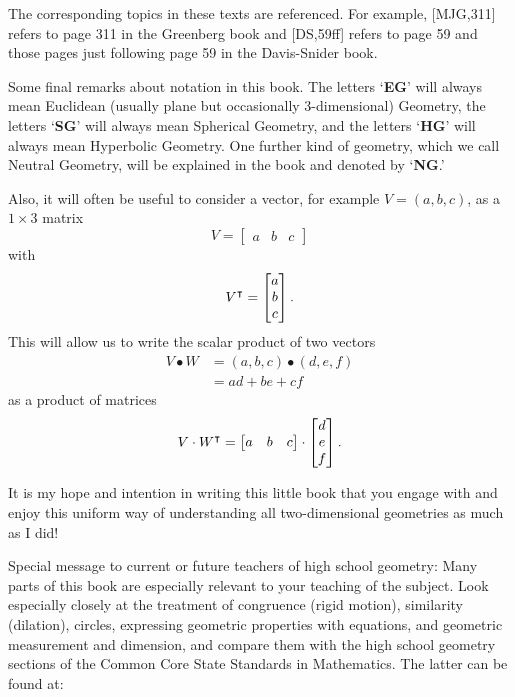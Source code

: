 \documentclass{ximera}
\begin{document}
The corresponding topics in these texts are referenced. For example, [MJG,311]
refers to page 311 in the Greenberg book and [DS,59ff] refers to page 59 and
those pages just following page 59 in the Davis-Snider book.

Some final remarks about notation in this book. The letters `\textbf{EG}' will
always mean Euclidean (usually plane but occasionally $3$-dimensional)
Geometry, the letters `\textbf{SG}' will always mean Spherical Geometry, and
the letters `\textbf{HG}' will always mean Hyperbolic Geometry. One further
kind of geometry, which we call Neutral Geometry, will be explained in the
book and denoted by `\textbf{NG}.'

Also, it will often be useful to consider a vector, for example
$V=\left(a,b,c\right)$, as a $1\times3$ matrix
\[
V=
\begin{bmatrix}
a & b & c
\end{bmatrix}
\]
with
\[
V^\intercal  =
\begin{bmatrix}
a\\
b\\
c
\end{bmatrix}.
\]
This will allow us to write the scalar product of two vectors%
\begin{align*}
V\bullet W  &  =\left(  a,b,c\right)  \bullet\left(d,e,f\right) \\
&  =ad+be+cf%
\end{align*}
as a product of matrices%
\[
V\cdot W^\intercal=
\begin{bmatrix}
a & b & c
\end{bmatrix} 
\cdot
\begin{bmatrix}
d\\
e\\
f
\end{bmatrix}.
\]


It is my hope and intention in writing this little book that you engage with
and enjoy this uniform way of understanding all two-dimensional geometries as
much as I did!

\begin{remark}
Special message to current or future teachers of high school geometry:
Many parts of this book are especially relevant to your teaching of
the subject. Look especially closely at the treatment of congruence
(rigid motion), similarity (dilation), circles, expressing geometric
properties with equations, and geometric measurement and dimension,
and compare them with the high school geometry sections of the Common
Core State Standards in Mathematics. The latter can be found at:
\end{remark}
\end{document}
